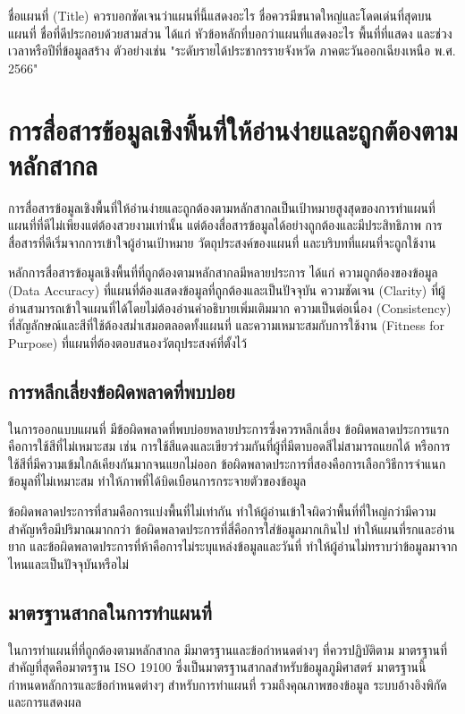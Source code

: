 ชื่อแผนที่ (Title) ควรบอกชัดเจนว่าแผนที่นี้แสดงอะไร ชื่อควรมีขนาดใหญ่และโดดเด่นที่สุดบนแผนที่ ชื่อที่ดีประกอบด้วยสามส่วน ได้แก่ หัวข้อหลักที่บอกว่าแผนที่แสดงอะไร พื้นที่ที่แสดง และช่วงเวลาหรือปีที่ข้อมูลสร้าง ตัวอย่างเช่น "ระดับรายได้ประชากรรายจังหวัด ภาคตะวันออกเฉียงเหนือ พ.ศ. 2566"

\section{การสื่อสารข้อมูลเชิงพื้นที่ให้อ่านง่ายและถูกต้องตามหลักสากล}

การสื่อสารข้อมูลเชิงพื้นที่ให้อ่านง่ายและถูกต้องตามหลักสากลเป็นเป้าหมายสูงสุดของการทำแผนที่ แผนที่ที่ดีไม่เพียงแต่ต้องสวยงามเท่านั้น แต่ต้องสื่อสารข้อมูลได้อย่างถูกต้องและมีประสิทธิภาพ การสื่อสารที่ดีเริ่มจากการเข้าใจผู้อ่านเป้าหมาย วัตถุประสงค์ของแผนที่ และบริบทที่แผนที่จะถูกใช้งาน

หลักการสื่อสารข้อมูลเชิงพื้นที่ที่ถูกต้องตามหลักสากลมีหลายประการ ได้แก่ ความถูกต้องของข้อมูล (Data Accuracy) ที่แผนที่ต้องแสดงข้อมูลที่ถูกต้องและเป็นปัจจุบัน ความชัดเจน (Clarity) ที่ผู้อ่านสามารถเข้าใจแผนที่ได้โดยไม่ต้องอ่านคำอธิบายเพิ่มเติมมาก ความเป็นต่อเนื่อง (Consistency) ที่สัญลักษณ์และสีที่ใช้ต้องสม่ำเสมอตลอดทั้งแผนที่ และความเหมาะสมกับการใช้งาน (Fitness for Purpose) ที่แผนที่ต้องตอบสนองวัตถุประสงค์ที่ตั้งไว้

\subsection{การหลีกเลี่ยงข้อผิดพลาดที่พบบ่อย}

ในการออกแบบแผนที่ มีข้อผิดพลาดที่พบบ่อยหลายประการซึ่งควรหลีกเลี่ยง ข้อผิดพลาดประการแรกคือการใช้สีที่ไม่เหมาะสม เช่น การใช้สีแดงและเขียวร่วมกันที่ผู้ที่มีตาบอดสีไม่สามารถแยกได้ หรือการใช้สีที่มีความเข้มใกล้เคียงกันมากจนแยกไม่ออก ข้อผิดพลาดประการที่สองคือการเลือกวิธีการจำแนกข้อมูลที่ไม่เหมาะสม ทำให้ภาพที่ได้บิดเบือนการกระจายตัวของข้อมูล

ข้อผิดพลาดประการที่สามคือการแบ่งพื้นที่ไม่เท่ากัน ทำให้ผู้อ่านเข้าใจผิดว่าพื้นที่ที่ใหญ่กว่ามีความสำคัญหรือมีปริมาณมากกว่า ข้อผิดพลาดประการที่สี่คือการใส่ข้อมูลมากเกินไป ทำให้แผนที่รกและอ่านยาก และข้อผิดพลาดประการที่ห้าคือการไม่ระบุแหล่งข้อมูลและวันที่ ทำให้ผู้อ่านไม่ทราบว่าข้อมูลมาจากไหนและเป็นปัจจุบันหรือไม่

\subsection{มาตรฐานสากลในการทำแผนที่}

ในการทำแผนที่ที่ถูกต้องตามหลักสากล มีมาตรฐานและข้อกำหนดต่างๆ ที่ควรปฏิบัติตาม มาตรฐานที่สำคัญที่สุดคือมาตรฐาน ISO 19100 ซึ่งเป็นมาตรฐานสากลสำหรับข้อมูลภูมิศาสตร์ มาตรฐานนี้กำหนดหลักการและข้อกำหนดต่างๆ สำหรับการทำแผนที่ รวมถึงคุณภาพของข้อมูล ระบบอ้างอิงพิกัด และการแสดงผล


